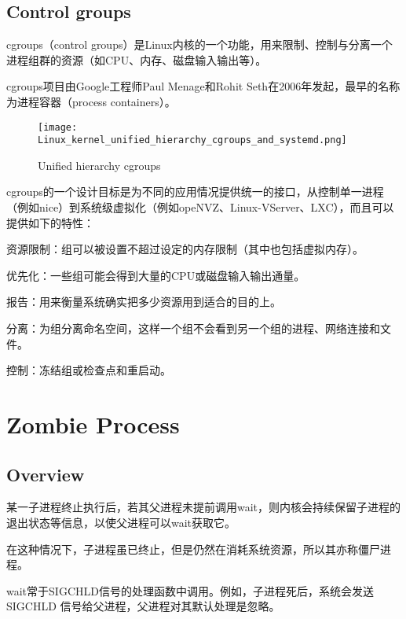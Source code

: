 \subsection{Control groups}

cgroups（control groups）是Linux内核的一个功能，用来限制、控制与分离一个进程组群的资源（如CPU、内存、磁盘输入输出等）。

cgroups项目由Google工程师Paul Menage和Rohit Seth在2006年发起，最早的名称为进程容器（process containers）。

\begin{figure}[!ht]
\centering
\texttt{[image: Linux\_kernel\_unified\_hierarchy\_cgroups\_and\_systemd.png]}
\caption{Unified hierarchy cgroups}
\end{figure}

cgroups的一个设计目标是为不同的应用情况提供统一的接口，从控制单一进程（例如nice）到系统级虚拟化（例如opeNVZ、Linux-VServer、LXC），而且可以提供如下的特性：

\begin{compactitem}
\item 资源限制：组可以被设置不超过设定的内存限制（其中也包括虚拟内存）。

\item 优先化：一些组可能会得到大量的CPU或磁盘输入输出通量。
\item 报告：用来衡量系统确实把多少资源用到适合的目的上。
\item 分离：为组分离命名空间，这样一个组不会看到另一个组的进程、网络连接和文件。
\item 控制：冻结组或检查点和重启动。
\end{compactitem}





\section{Zombie Process}


\subsection{Overview}


某一子进程终止执行后，若其父进程未提前调用wait，则内核会持续保留子进程的退出状态等信息，以使父进程可以wait获取它。

在这种情况下，子进程虽已终止，但是仍然在消耗系统资源，所以其亦称僵尸进程。


wait常于SIGCHLD信号的处理函数中调用。例如，子进程死后，系统会发送SIGCHLD 信号给父进程，父进程对其默认处理是忽略。

